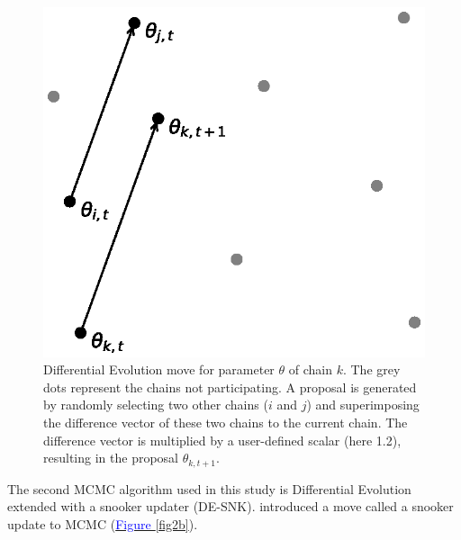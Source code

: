 \begin{figure}[ht]
\centering
\includegraphics[width=1.0\linewidth]{Figures/DE_move_2025.eps}
\caption{Differential Evolution move for parameter $\theta$ of chain $k$. The grey dots represent the chains not participating. A proposal is generated by randomly selecting two other chains ($i$ and $j$) and superimposing the difference vector of these two chains to the current chain. The difference vector is multiplied by a user-defined scalar (here 1.2), resulting in the proposal $\theta_{k,t+1}$.}\label{fig2}
\end{figure}

The second MCMC algorithm used in this study is Differential Evolution extended with a snooker updater (DE-SNK). \cite{terbraak2008differential} introduced a move called a snooker update to MCMC (\hyperref[fig2b]{\textcolor{blue}{Figure }\ref{fig2b}}).

